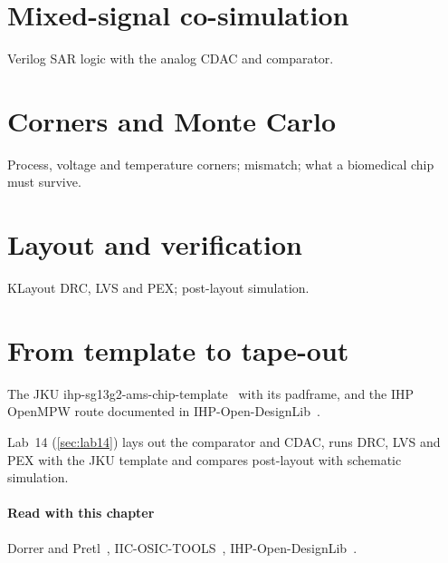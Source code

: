\section{Mixed-signal co-simulation}\label{sec:ch30-3}
Verilog SAR logic with the analog CDAC and comparator.

\section{Corners and Monte Carlo}\label{sec:ch30-4}
Process, voltage and temperature corners; mismatch; what a biomedical chip must survive.

\section{Layout and verification}\label{sec:ch30-5}
KLayout DRC, LVS and PEX; post-layout simulation.

\section{From template to tape-out}\label{sec:ch30-6}
The JKU ihp-sg13g2-ams-chip-template~\cite{jkutemplate} with its padframe, and the IHP OpenMPW route documented in IHP-Open-DesignLib~\cite{ihpdesignlib}.

\begin{tryit}
Lab~14 (\cref{sec:lab14}) lays out the comparator and CDAC, runs DRC, LVS and PEX with the JKU template and compares post-layout with schematic simulation.
\end{tryit}

\paragraph{Read with this chapter} Dorrer and Pretl~\cite{jkutemplate}, IIC-OSIC-TOOLS~\cite{iicosic}, IHP-Open-DesignLib~\cite{ihpdesignlib}.
